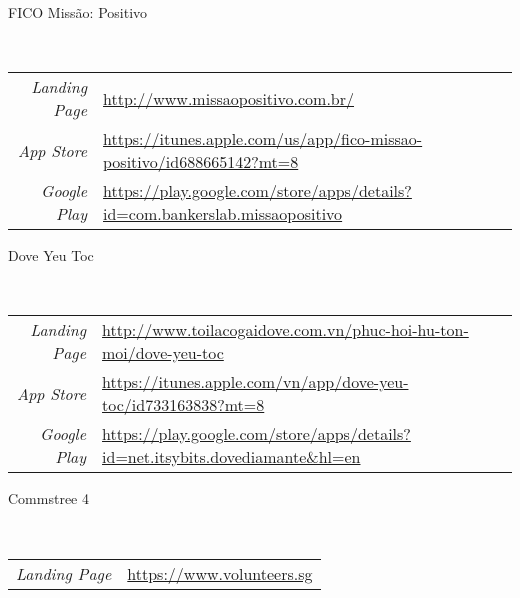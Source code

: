 \documentclass[a4paper,10pt]{article}
\begin{document}
\hfill
\par{\centering\Large \hypertarget{fico-links}{FICO Missão: Positivo}\par}
\hrulefill\\
\newline
\begin{tabular}{rl}
    \textit{Landing Page} & \url{http://www.missaopositivo.com.br/}\\
    \textit{App Store} & \small \url{https://itunes.apple.com/us/app/fico-missao-positivo/id688665142?mt=8}\\
    \textit{Google Play} & \small \url{https://play.google.com/store/apps/details?id=com.bankerslab.missaopositivo}
\end{tabular}

\hfill
\par{\centering\Large \hypertarget{dove-links}{Dove Yeu Toc}\par}
\hrulefill\\
\newline
\begin{tabular}{rl}
    \textit{Landing Page} & \url{http://www.toilacogaidove.com.vn/phuc-hoi-hu-ton-moi/dove-yeu-toc}\\
    \textit{App Store} & \small \url{https://itunes.apple.com/vn/app/dove-yeu-toc/id733163838?mt=8}\\
    \textit{Google Play} & \small \url{https://play.google.com/store/apps/details?id=net.itsybits.dovediamante&hl=en}
\end{tabular}

\hfill
\par{\centering\Large \hypertarget{ct-links}{Commstree 4}\par}
\hrulefill\\
\newline
\begin{tabular}{rl}
    \textit{Landing Page} & \url{https://www.volunteers.sg}\\
\end{tabular}



\end{document}
